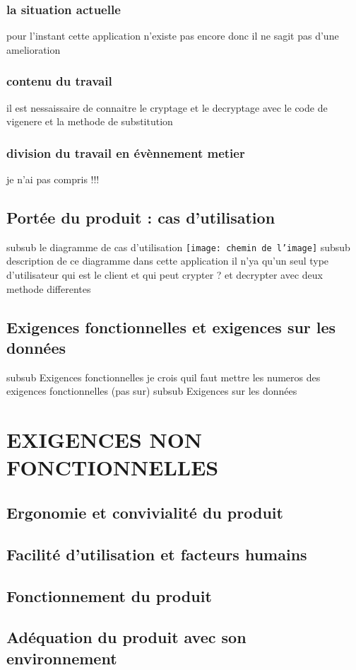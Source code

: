 \documentclass[a4]{article}
\begin{document}
			\subsubsection{la situation actuelle}
				pour l'instant cette application n'existe pas encore 
				donc il ne sagit pas d'une amelioration
			\subsubsection{contenu du travail}
				il est nessaissaire de connaitre le cryptage et le decryptage avec 
				le code de vigenere et la methode de substitution
			\subsubsection{division du travail en évènnement metier}
				je n'ai pas compris !!!
		\subsection{Portée du produit : cas d’utilisation}
			subsub le diagramme de cas d'utilisation
				\texttt{[image: chemin de l'image]}
			subsub description de ce diagramme
				dans cette application il n'ya qu'un seul type d'utilisateur qui est le client 
				et qui peut crypter ? et decrypter avec deux methode differentes
		\subsection{Exigences fonctionnelles et exigences sur les données}
			subsub Exigences fonctionnelles
				je crois quil faut mettre les numeros des exigences fonctionnelles (pas sur)
			subsub Exigences sur les données 
	\section{EXIGENCES NON FONCTIONNELLES}
		\subsection{Ergonomie et convivialité du produit}
		\subsection{Facilité d’utilisation et facteurs humains}
		\subsection{Fonctionnement du produit}
		\subsection{Adéquation du produit avec son environnement}
\end{document}
